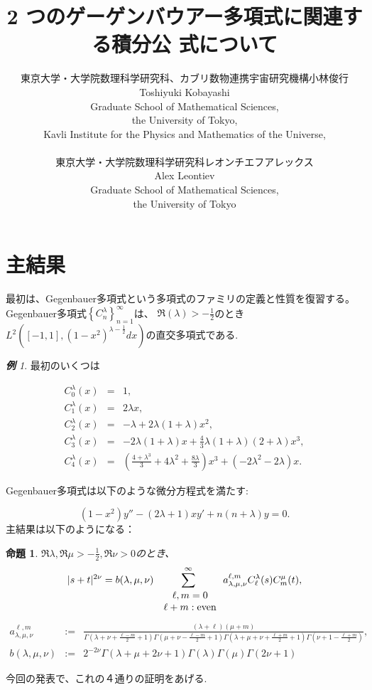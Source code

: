 \documentclass[12pt]{article} %
\title{2 つのゲーゲンバウアー多項式に関連する積分公 式について}
\author{東京大学・大学院数理科学研究科、カブリ数物連携宇宙研究機構\quad 小林\quad 俊行\\
Toshiyuki Kobayashi\\
Graduate School of Mathematical Sciences,\\
the University of Tokyo,\\
Kavli Institute for the Physics and Mathematics of the Universe,\\\\
東京大学・大学院数理科学研究科\quad レオンチエフ\quad アレックス\\
Alex Leontiev\\
Graduate School of Mathematical Sciences,\\
the University of Tokyo
}
\date{} %
\newtheorem{prop}{命題}
\theoremstyle{remark}
\newtheorem*{example*}{\textbf{例}}
\newcommand{\tmop}[1]{\ensuremath{\operatorname{#1}}}
\begin{document}
\maketitle

\section{主結果}
	最初は、Gegenbauer多項式という多項式のファミリの定義と性質を復習する。
	Gegenbauer多項式$\left\{ C_n^\lambda \right\}_{n=1}^{\infty}$は、
	$\Re(\lambda)>-\frac{1}{2}$のとき$L^2\left( [-1,1],(1-x^2)^{\lambda-\frac{1}{2}}dx \right)$の直交多項式である.
	
	\begin{example*}
		最初のいくつは
	
		\begin{eqnarray*}
			C_0^\lambda(x)&=&1,\\
			C_1^\lambda(x)&=&2\lambda x,\\
			C_2^\lambda(x)&=&-\lambda+2\lambda(1+\lambda)x^2,\\
			C_3^\lambda(x)&=&-2\lambda(1+\lambda)x+\frac{4}{3}\lambda(1+\lambda)(2+\lambda)x^3,\\
			C_4^\lambda(x)&=&\left(\frac{4+\lambda^3}{3}+4\lambda^2+\frac{8\lambda}{3}  \right)x^3+(-2\lambda^2-2\lambda)x.
		\end{eqnarray*}
	\end{example*}
	Gegenbauer多項式は以下のような微分方程式を満たす:
		
	\begin{equation*}
		(1-x^2)y''-(2\lambda+1)xy'+n(n+\lambda)y=0.
	\end{equation*}
	主結果は以下のようになる：
	\begin{prop}\label{prop:exp-st-gg}
		$\Re\lambda,\Re\mu>-\frac{1}{2},\Re\nu>0$のとき、
		\begin{equation}
			| s + t |^{2 \nu} =b(\lambda,\mu,\nu) \sum_{\mbox{ $\begin{array}[]{c}
			\ell, m = 0 \\ \ell + m : \tmop{even}
		\end{array}$}}^{\infty} a_{\lambda,\mu,\nu}^{\ell,m} C_\ell^{\lambda} (s) C_m^{\mu} (t),
			\label{eqn:exp-st-gg}
		\end{equation}
		{
			\begin{equation*}
				\begin{array}{rcl}
	a_{\lambda,\mu,\nu}^{\ell,m}&:=&\frac{ (\lambda + \ell) (\mu + m)}{\Gamma \left( \lambda + \nu + \frac{\ell -
	  m}{2} + 1 \right)  \Gamma \left( \mu + \nu -
	  \frac{\ell - m}{2} + 1 \right)\Gamma \left( \lambda + \mu + \nu + \frac{\ell +
	  m}{2} + 1 \right)\Gamma\left(  \nu+1-\frac{\ell+m}{2}\right)},\\[0.4cm]
	  b(\lambda,\mu,\nu)&:=&2^{-2\nu}\Gamma (\lambda + \mu + 2 \nu + 1){\Gamma (\lambda)
	  \Gamma (\mu)\Gamma \left( 2\nu +
	1 \right)}
			\end{array}
			\end{equation*}
	}
	\end{prop}
	今回の発表で、これの４通りの証明をあげる.
\end{document}
